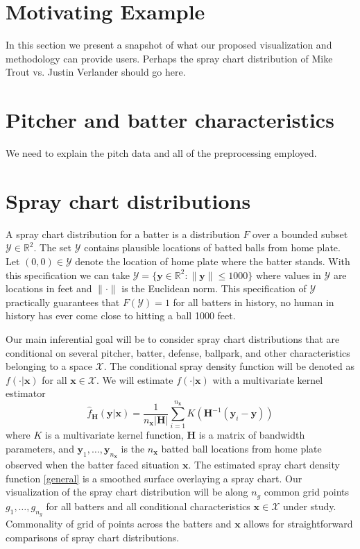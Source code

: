 \documentclass[11pt]{article}
\newcommand{\R}{\mathbb{R}}
\newcommand{\Y}{\mathcal{Y}}
\newcommand{\X}{\mathcal{X}}
\newcommand{\Hbf}{\textbf{H}}
\newcommand{\y}{\textbf{y}}
\newcommand{\x}{\textbf{x}}
\begin{document}
\section{Motivating Example}

In this section we present a snapshot of what our proposed visualization and methodology can provide users. Perhaps the spray chart distribution of Mike Trout vs. Justin Verlander should go here.


\section{Pitcher and batter characteristics}

We need to explain the pitch data and all of the preprocessing employed. 


\section{Spray chart distributions}

A spray chart distribution for a batter is a distribution $F$ over a bounded subset $\Y \in \R^2$. The set $\Y$ contains plausible locations of batted balls from home plate. Let $(0,0) \in \Y$ denote the location of home plate where the batter stands. With this specification we can take $\Y = \{\y \in \R^2: \|\y\| \leq 1000\}$ where values in $\Y$ are locations in feet and $\|\cdot\|$ is the Euclidean norm. This specification of $\Y$ practically guarantees that $F(\Y) = 1$ for all batters in history, no human in history has ever come close to hitting a ball 1000 feet.

Our main inferential goal will be to consider spray chart distributions that are conditional on several pitcher, batter, defense, ballpark, and other characteristics belonging to a space $\X$. 
The conditional spray density function will be denoted as $f(\cdot|\x)$ for all $\x \in \X$.
We will estimate $f(\cdot|\x)$ with a multivariate kernel estimator
\begin{equation} \label{general}
  \hat f_\Hbf(\y|\x) = \frac{1}{n_\x|\Hbf|}\sum_{i=1}^{n_\x} K\left(\Hbf^{-1}(\y_i - \y)\right)
\end{equation}
where $K$ is a multivariate kernel function, $\Hbf$ is a matrix of bandwidth parameters, and 
$\y_1,\ldots,\y_{n_\x}$ is the $n_\x$ batted ball locations from home plate observed when the batter faced situation $\x$. The estimated spray chart density function \eqref{general} is a smoothed surface overlaying a spray chart. Our visualization of the spray chart distribution will be along $n_g$ common grid points $g_1,\ldots,g_{n_g}$ for all batters and all conditional characteristics $\x \in \X$ under study. Commonality of grid of points across the batters and $\x$ allows for straightforward comparisons of spray chart distributions.
\end{document}
